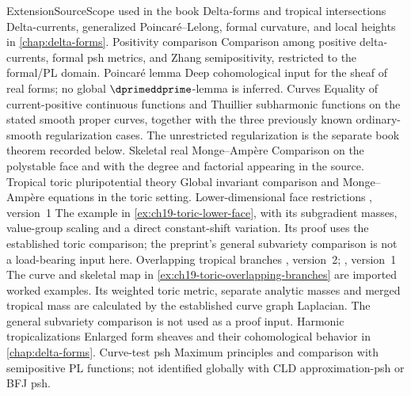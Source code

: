 \begin{AppLProvenanceLedger}{Extension}{Source}{Scope used in the book}
\AppLProvenanceRecord
  {Delta-forms and tropical intersections}
  {\cite{GK17}}
  {Delta-currents, generalized Poincaré--Lelong, formal curvature, and
   local heights in \cref{chap:delta-forms}.}
\AppLProvenanceRecord
  {Positivity comparison}
  {\cite{GK19}}
  {Comparison among positive delta-currents, formal psh metrics, and
   Zhang semipositivity, restricted to the formal/PL domain.}
\AppLProvenanceRecord
  {Poincaré lemma}
  {\cite{Jell16}}
  {Deep cohomological input for the sheaf of real forms; no global
   \(\dprimeddprime\)-lemma is inferred.}
\AppLProvenanceRecord
  {Curves}
  {\cite{Wanner19}}
  {Equality of current-positive continuous functions and Thuillier
   subharmonic functions on the stated smooth proper curves, together with
   the three previously known ordinary-smooth regularization cases.  The
   unrestricted regularization is the separate book theorem recorded below.}
\AppLProvenanceRecord
  {Skeletal real Monge--Ampère}
  {\cite{Vil20}}
  {Comparison on the polystable face and with the degree and factorial
   appearing in the source.}
\AppLProvenanceRecord
  {Tropical toric pluripotential theory}
  {\cite{BGJKK25}}
  {Global invariant comparison and Monge--Ampère equations in the toric
   setting.}
\AppLProvenanceRecord
  {Lower-dimensional face restrictions}
  {\cite[Remark~9.8]{Lin26}, version~1}
  {The example in \cref{ex:ch19-toric-lower-face}, with its subgradient
   masses, value-group scaling and a direct constant-shift variation.
   Its proof uses the established toric comparison; the preprint's
   general subvariety comparison is not a load-bearing input here.}
\AppLProvenanceRecord
  {Overlapping tropical branches}
  {\cite[Examples~2.6, 8.7 and~8.11]{BPR12}, version~2;
   \cite[Example~10.1]{Lin26}, version~1}
  {The curve and skeletal map in
   \cref{ex:ch19-toric-overlapping-branches} are imported worked examples.
   Its weighted toric metric, separate analytic masses and merged tropical
   mass are calculated by the established curve graph Laplacian.
   The general subvariety comparison is not used as a proof input.}
\AppLProvenanceRecord
  {Harmonic tropicalizations}
  {\cite{GJR26}}
  {Enlarged form sheaves and their cohomological behavior in
   \cref{chap:delta-forms}.}
\AppLProvenanceRecord
  {Curve-test psh}
  {\cite{GR25PL,GR25Classical}}
  {Maximum principles and comparison with semipositive PL functions;
   not identified globally with CLD approximation-psh or BFJ psh.}
\end{AppLProvenanceLedger}

